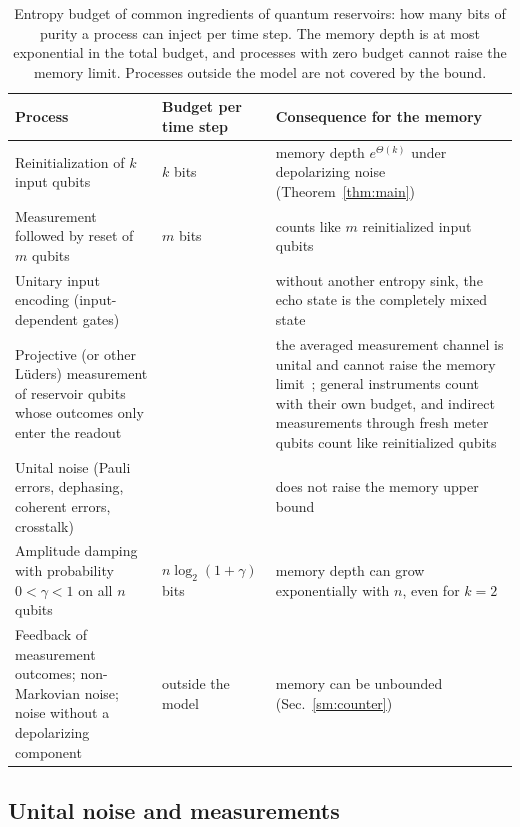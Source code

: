 \documentclass[aps,prl,twocolumn,superscriptaddress,floatfix]{revtex4-2}
\theoremstyle{plain}
\begin{document}
\begin{table}[t]
\caption{Entropy budget of common ingredients of quantum reservoirs: how many bits of purity a process can inject per time step. The memory depth is at most exponential in the total budget, and processes with zero budget cannot raise the memory limit. Processes outside the model are not covered by the bound.}
\label{tabS:budget}
\begin{ruledtabular}
\begin{tabular}{>{\raggedright\arraybackslash}p{5.3cm}>{\raggedright\arraybackslash}p{2.7cm}>{\raggedright\arraybackslash}p{8.3cm}}
Process & Budget per time step & Consequence for the memory \\ \hline
Reinitialization of $k$ input qubits & $k$ bits & memory depth $e^{\Theta(k)}$ under depolarizing noise (Theorem~\ref{thm:main}) \\
Measurement followed by reset of $m$ qubits & $m$ bits & counts like $m$ reinitialized input qubits~\cite{Yasuda2023,Hu2024} \\
Unitary input encoding (input-dependent gates) & 0 & without another entropy sink, the echo state is the completely mixed state \\
Projective (or other L\"uders) measurement of reservoir qubits whose outcomes only enter the readout & 0 & the averaged measurement channel is unital and cannot raise the memory limit~\cite{Mujal2023}; general instruments count with their own budget, and indirect measurements through fresh meter qubits count like reinitialized qubits~\cite{MorguiSancho2026} \\
Unital noise (Pauli errors, dephasing, coherent errors, crosstalk) & 0 & does not raise the memory upper bound \\
Amplitude damping with probability $0<\gamma<1$ on all $n$ qubits & $n\log_2(1+\gamma)$ bits & memory depth can grow exponentially with $n$, even for $k=2$~\cite{BenOr2013,Monzani2024,Freiheit2026} \\
Feedback of measurement outcomes; non-Markovian noise; noise without a depolarizing component & outside the model & memory can be unbounded (Sec.~\ref{sm:counter})~\cite{Sannia2026} \\
\end{tabular}
\end{ruledtabular}
\end{table}

\subsection{Unital noise and measurements}
\end{document}

